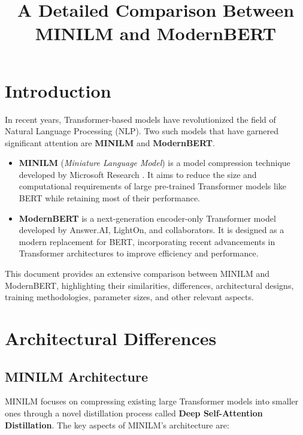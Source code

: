 \documentclass{article}
\begin{document}
  
  
\title{A Detailed Comparison Between MINILM and ModernBERT}  
\author{}  
\date{}  
\maketitle  
  
\tableofcontents  
  
\section{Introduction}  
  
In recent years, Transformer-based models have revolutionized the field of Natural Language Processing (NLP). Two such models that have garnered significant attention are \textbf{MINILM} and \textbf{ModernBERT}.   
  
\begin{itemize}  
    \item \textbf{MINILM} (\emph{Miniature Language Model}) is a model compression technique developed by Microsoft Research \cite{wang2020minilm}. It aims to reduce the size and computational requirements of large pre-trained Transformer models like BERT while retaining most of their performance.  
    \item \textbf{ModernBERT} is a next-generation encoder-only Transformer model developed by Answer.AI, LightOn, and collaborators. It is designed as a modern replacement for BERT, incorporating recent advancements in Transformer architectures to improve efficiency and performance.  
\end{itemize}  
  
This document provides an extensive comparison between MINILM and ModernBERT, highlighting their similarities, differences, architectural designs, training methodologies, parameter sizes, and other relevant aspects.  
  
\section{Architectural Differences}  
  
\subsection{MINILM Architecture}  
  
MINILM focuses on compressing existing large Transformer models into smaller ones through a novel distillation process called \textbf{Deep Self-Attention Distillation}. The key aspects of MINILM's architecture are:  
  
\end{document}
